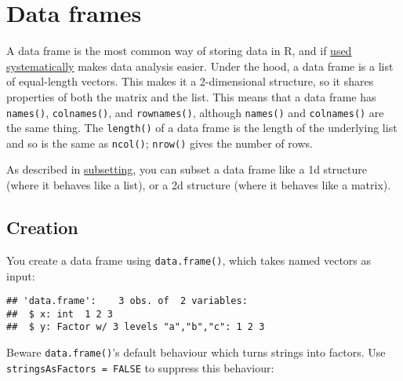 \hypertarget{data-frames}{%
\section{Data frames}\label{data-frames}}

A data frame is the most common way of storing data in R, and if
\href{http://vita.had.co.nz/papers/tidy-data.pdf}{used systematically}
makes data analysis easier. Under the hood, a data frame is a list of
equal-length vectors. This makes it a 2-dimensional structure, so it
shares properties of both the matrix and the list. This means that a
data frame has \texttt{names()}, \texttt{colnames()}, and
\texttt{rownames()}, although \texttt{names()} and \texttt{colnames()}
are the same thing. The \texttt{length()} of a data frame is the length
of the underlying list and so is the same as \texttt{ncol()};
\texttt{nrow()} gives the number of rows. 

As described in \protect\hyperlink{subsetting}{subsetting}, you can
subset a data frame like a 1d structure (where it behaves like a list),
or a 2d structure (where it behaves like a matrix).

\hypertarget{creation}{%
\subsection{Creation}\label{creation}}

You create a data frame using \texttt{data.frame()}, which takes named
vectors as input:

\begin{Shaded}
\begin{Highlighting}[]
\StringTok{ }\NormalTok{(} \OperatorTok{:}\NormalTok{, } \NormalTok{(}\NormalTok{, }\NormalTok{, }\NormalTok{))}
\end{Highlighting}
\end{Shaded}

\begin{verbatim}
## 'data.frame':    3 obs. of  2 variables:
##  $ x: int  1 2 3
##  $ y: Factor w/ 3 levels "a","b","c": 1 2 3
\end{verbatim}

Beware \texttt{data.frame()}'s default behaviour which turns strings
into factors. Use \texttt{stringsAsFactors\ =\ FALSE} to suppress this
behaviour: 

